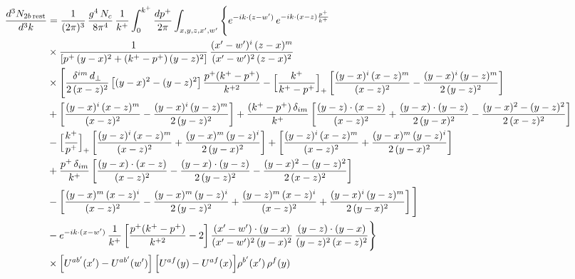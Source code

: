 \documentclass[9pt]{article}
\numberwithin{equation}{section}
\begin{document}
{\begin{align*}
\end{align*}
\begin{align*}
\frac{d^{3}N_{2b\,\rm rest}}{d^{3}k} & =\frac{1}{(2\pi)^{3}}\,\frac{g^{4}\,N_{c}}{8\pi^{4}}\,\frac{1}{k^{+}}\int_{0}^{k^{+}}\frac{dp^{+}}{2\pi}\int_{x,y,z,x',w'}\Bigg\{e^{-ik\cdot(z-w')}\,e^{-ik\cdot(x-z)\frac{p^{+}}{k^{+}}}\notag \\ & \times\frac{1}{\left[p^{+}\,(y-x)^{2}+(k^{+}-p^{+})\,(y-z)^{2}\right]}\,\frac{(x'-w')^{i}\,(z-x)^{m}}{(x'-w')^{2}\,(z-x)^{2}}\notag\\
&\times\Bigg[\frac{\delta^{im}\,d_{\perp}}{2\,(x-z)^{2}}\left[(y-x)^{2}-(y-z)^{2}\right]\frac{p^{+}(k^{+}-p^{+})}{k^{+2}}
-\Big[\frac{k^{+}}{k^{+}-p^{+}}\Big]_{+}\left[\frac{(y-x)^{i}\,(x-z)^{m}}{(x-z)^{2}}-\frac{(y-x)^{i}\,(y-z)^{m}}{2\,(y-z)^{2}}\right]\notag\\
&+\left[\frac{(y-x)^{i}\,(x-z)^{m}}{(x-z)^{2}}-\frac{(y-x)^{i}\,(y-z)^{m}}{2\,(y-z)^{2}}\right]
+\frac{(k^{+}-p^{+})\,\delta_{im}}{k^{+}}\left[\frac{(y-z)\cdot(x-z)}{(x-z)^{2}}+\frac{(y-x)\cdot(y-z)}{2\,(y-x)^{2}}-\frac{(y-x)^{2}-(y-z)^{2}}{2\,(x-z)^{2}}\right]\notag\\
&-\Big[\frac{k^{+}}{p^{+}}\Big]_{+}\left[\frac{(y-z)^{i}\,(x-z)^{m}}{(x-z)^{2}}+\frac{(y-x)^{m}\,(y-z)^{i}}{2\,(y-x)^{2}}\right]+\left[\frac{(y-z)^{i}\,(x-z)^{m}}{(x-z)^{2}}+\frac{(y-x)^{m}\,(y-z)^{i}}{2\,(y-x)^{2}}\right]\notag\\
&+\frac{p^{+}\,\delta_{im}}{k^{+}}\left[\frac{(y-x)\cdot(x-z)}{(x-z)^{2}}-\frac{(y-x)\cdot(y-z)}{2\,(y-z)^{2}}-\frac{(y-x)^{2}-(y-z)^{2}}{2\,(x-z)^{2}}\right]\notag\\
&-\left[\frac{(y-x)^{m}\,(x-z)^{i}}{(x-z)^{2}}-\frac{(y-x)^{m}\,(y-z)^{i}}{2\,(y-z)^{2}}+\frac{(y-z)^{m}\,(x-z)^{i}}{(x-z)^{2}}+\frac{(y-x)^{i}\,(y-z)^{m}}{2\,(y-x)^{2}}\right]\Bigg]\notag\\
&-e^{-ik\cdot(x-w')}\,\frac{1}{k^{+}}\left[\frac{p^{+}(k^{+}-p^{+})}{k^{+2}}-2\right]\frac{(x'-w')\cdot(y-x)}{(x'-w')^{2}\,(y-x)^{2}}\,\frac{(y-z)\cdot(y-x)}{(y-z)^{2}\,(x-z)^{2}}\Bigg\}\notag\\
&\times\Big[U^{ab'}(x')-U^{ab'}(w')\Big]\,\Big[U^{af}(y)-U^{af}(x)\Big]\rho^{b'}(x')\,\rho^{f}(y)
\end{align*}
}\par
\end{document}

